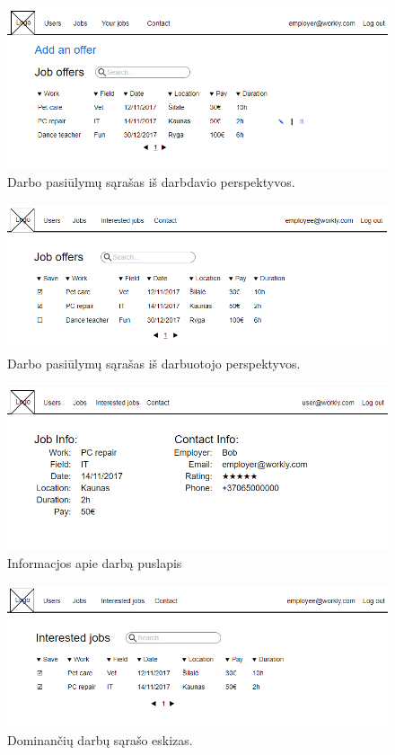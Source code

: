 \documentclass{VUMIFPSkursinis}
\begin{document}
\begin{figure}[H]
\centering
\includegraphics[width=\linewidth, frame]{img/employerJobs.png}
\caption{Darbo pasiūlymų sąrašas iš darbdavio perspektyvos.}
\end{figure}

\begin{figure}[H]
\centering
\includegraphics[width=\linewidth, frame]{img/employeeJobs.png}
\caption{Darbo pasiūlymų sąrašas iš darbuotojo perspektyvos.}
\end{figure}

\begin{figure}[H]
\centering
\includegraphics[width=\linewidth, frame]{img/jobInfo.png}
\caption{Informacjos apie darbą puslapis}
\end{figure}


\begin{figure}[H]
\centering
\includegraphics[width=\linewidth, frame]{img/interestedJobs.png}
\caption{Dominančių darbų sąrašo eskizas.}
\end{figure}
\end{document}
